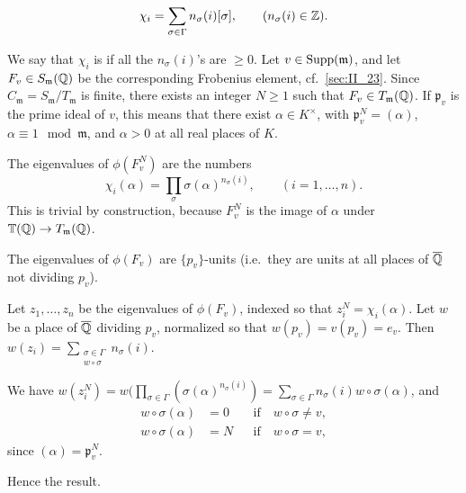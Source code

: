 \[
	\chi_i = \sum_{\sigma \in \Gamma} n_\sigma (i)[\sigma], \qquad
	(n_\sigma(i) \in \mathbb{Z}).
\]

We say that $ \chi_i $ is  if all the $n_\sigma(i)$'s are 
$\geq 0$. Let $v \in \operatorname{Supp}(\mathfrak{m})$, and let $F_v \in S_\mathfrak{m}(\mathbb{Q})
$ be the corresponding Frobenius element, cf.\ \ref{sec:II_23}. Since
$C_\mathfrak{m} = S_\mathfrak{m} / T_\mathfrak{m}$ is finite, there exists an
integer $N \geq 1$ such that $ F_v \in T_\mathfrak{m}(\mathbb{Q})$. If $\mathfrak{p}_v$
is the prime ideal of $v$, this means that there exist $ \alpha \in K^\times$,
with $\mathfrak{p}_v^N = ( \alpha )$, $ \alpha \equiv 1 \mod \mathfrak{m}$, and
$ \alpha > 0 $ at all real places of $K$.
 
\dpage

\begin{prop}\label{prop:II_34_1}
	The eigenvalues of $ \phi(F_v^N)$ are the numbers 
\[
	\chi_i( \alpha ) = \prod_\sigma \sigma( \alpha )^{n_\sigma(i)}, \qquad
(i = 1,\dots,n).
\]
This is trivial by construction, because $F_v^N$ is the image of $\alpha$ under
$ \mathbb{T}(\mathbb{Q}) \rightarrow T_\mathfrak{m}(\mathbb{Q})$.
\end{prop}

\begin{corp}\label{corp:II_34_1} 
The eigenvalues of $\phi(F_v)$ are $\{ p_v \}$-units (i.e.\ they are units at 
all places of $\overline{\mathbb{Q}}$ not dividing $p_v$).
\end{corp}

\begin{corp}\label{corp:II_34_2}
Let $z_1,\dots,z_n$ be the eigenvalues of $\phi(F_v)$, indexed so that $z_i^N 
= \chi_i(\alpha)$. Let $w$ be a place of $\overline{\mathbb{Q}}$ dividing $p_v$, 
normalized so that $w(p_v) = v(p_v) = e_v$. Then $w(z_i) = 
\sum_{\substack{\sigma\in \Gamma \\ w \circ \sigma}} n_\sigma(i)$.
\end{corp}

We have $w(z_i^N) = w(\prod_{\sigma \in \Gamma} \left(\sigma
(\alpha)^{n_\sigma(i)}\right) = \sum_{\sigma \in \Gamma}n_\sigma(i)
w \circ \sigma(\alpha)$, and
\begin{align*}
	w \circ \sigma(\alpha) &= 0 &&\text{if} \quad w \circ \sigma \neq v,\\
	w \circ \sigma(\alpha) &= N &&\text{if} \quad w \circ \sigma = v,
\end{align*}
since $(\alpha) = \mathfrak{p}_v^N$.

Hence the result.


